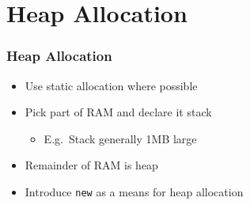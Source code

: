 \section{Heap Allocation}

\begin{frame}
  \tableofcontents[currentsection]
\end{frame}

\begin{frame}
  \frametitle{Heap Allocation}
  \begin{itemize}
    \item Use static allocation where possible
    \item Pick part of RAM and declare it stack
          \begin{itemize}
            \item E.g.~Stack generally 1MB large
          \end{itemize}
    \item Remainder of RAM is heap
    \item Introduce \texttt{new} as a means for heap allocation
  \end{itemize}
  \vskip5mm
  \begin{center}
  \end{center}
\end{frame}

